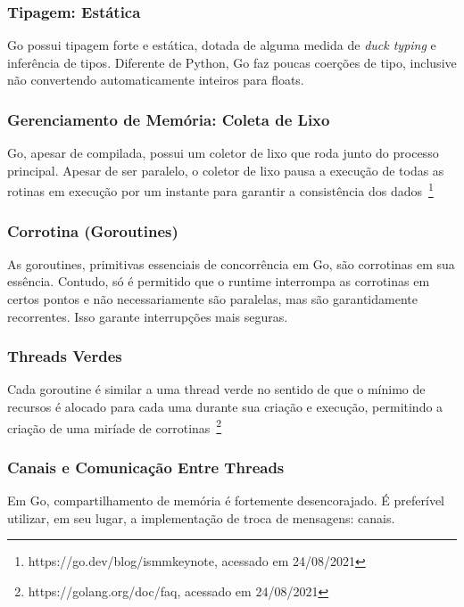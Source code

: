 \documentclass[12pt,a4paper]{article}
\begin{document}
\subsubsection{Tipagem: Estática}
\label{sssec:go tipagem}

Go possui tipagem forte e estática, dotada de alguma medida de \emph{duck typing} e inferência de tipos. Diferente de Python, Go faz poucas coerções de tipo, inclusive não convertendo automaticamente inteiros para floats.

\subsubsection{Gerenciamento de Memória: Coleta de Lixo}
\label{sssec:go memoria}

Go, apesar de compilada, possui um coletor de lixo que roda junto do processo principal. Apesar de ser paralelo, o coletor de lixo pausa a execução de todas as rotinas em execução por um instante para garantir a consistência dos dados~\footnote{https://go.dev/blog/ismmkeynote, acessado em 24/08/2021}

\subsubsection{Corrotina (Goroutines)}
\label{sssec:go corrotina}

As goroutines, primitivas essenciais de concorrência em Go, são corrotinas em sua essência. Contudo, só é permitido que o runtime interrompa as corrotinas em certos pontos e não necessariamente são paralelas, mas são garantidamente recorrentes. Isso garante interrupções mais seguras.

\subsubsection{Threads Verdes}
\label{sssec:go threads verdes}

Cada goroutine é similar a uma thread verde no sentido de que o mínimo de recursos é alocado para cada uma durante sua criação e execução, permitindo a criação de uma miríade de corrotinas~\footnote{https://golang.org/doc/faq, acessado em 24/08/2021}

\subsubsection{Canais e Comunicação Entre Threads}
\label{sssec:go canais}

Em Go, compartilhamento de memória é fortemente desencorajado. É preferível utilizar, em seu lugar, a implementação de troca de mensagens: canais.
\end{document}

